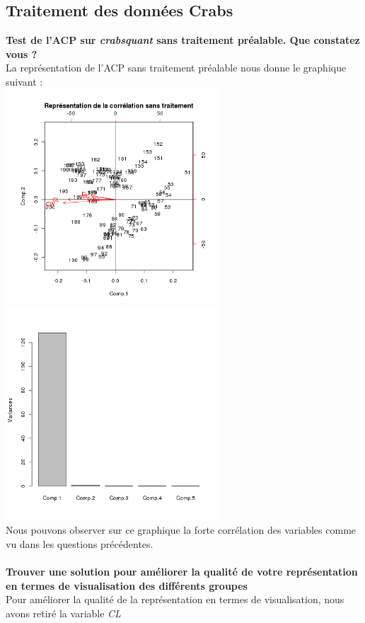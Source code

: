 \documentclass[a4paper, 10pt]{article}
\begin{document}
\subsection{Traitement des donn\'ees Crabs}
\textbf{Test de l'ACP sur \textit{crabsquant} sans traitement pr\'ealable. Que constatez vous ?}\\
La repr\'esentation de l'ACP sans traitement pr\'ealable nous donne le graphique suivant :\\
\includegraphics[height = 8cm, width = 8cm]{plots/biplot_acp2_crabs.png}
\includegraphics[height = 8cm, width = 8cm]{plots/plot_acp2_crabs.png}\\
Nous pouvons observer sur ce graphique la forte corr\'elation des variables comme vu dans les questions pr\'ec\'edentes.\\ \\
\textbf{Trouver une solution pour am\'eliorer la qualit\'e de votre repr\'esentation en termes de visualisation des diff\'erents groupes}\\
Pour am\'eliorer la qualit\'e de la repr\'esentation en termes de visualisation, nous avons retir\'e la variable \textit{CL}
\end{document}
